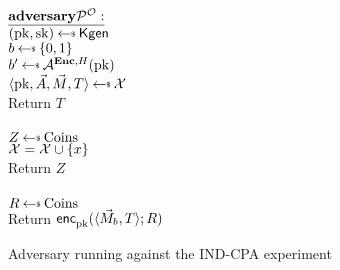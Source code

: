 \begin{figure}[tbhp]
\begin{center}
{
 $\adversaryv{\advP^{\mathcal{O}}}$\\
 $(\pk,\sk) \getsr \Kgen$\\
 $b \getsr \bits$\\
 $b' \getsr \advA^{\encOracle,H}(\pk)$\\
 $\langle \pk,\vad,\vmsg,T \rangle \getsr \cal X$\\
Return $T$\\ 

\\
  $Z \getsr \mathrm{Coins}$\\
  $\mathcal{X} = \mathcal{X} \cup \{x\}$ \\
  Return $Z$\\

\\
$R \getsr \mathrm{Coins}$\\
Return ${\mathsf{enc}}_{\mathrm{pk}}^{}(\langle \vec{M}_b,T\rangle;R)$\\

}
\caption{Adversary running against the IND-CPA experiment }
\label{fig:CPA}
\end{center}
\end{figure}

